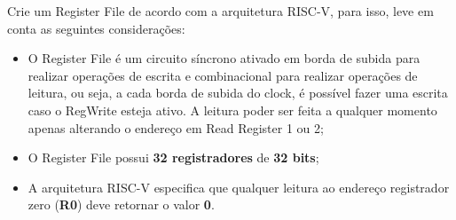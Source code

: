 \documentclass[a4paper]{article}
\begin{document}
Crie um Register File de acordo com a arquitetura RISC-V, para isso, leve em conta as seguintes considerações:
	\begin{itemize}
    \item O Register File é um circuito síncrono ativado em borda de subida para realizar operações de escrita e combinacional para realizar operações de leitura, ou seja, a cada borda de subida do clock, é possível fazer uma escrita caso o RegWrite esteja ativo. A leitura poder ser feita a qualquer momento apenas alterando o endereço em Read Register 1 ou 2;
    \item O Register File possui \textbf{32 registradores} de \textbf{32 bits};
    \item A arquitetura RISC-V especifica que qualquer leitura ao endereço registrador zero (\textbf{R0}) deve retornar o valor \textbf{0}.
    \end{itemize}
\end{document}

